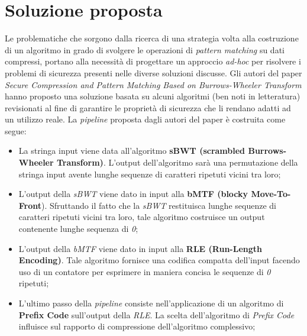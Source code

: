 \section{Soluzione proposta} %
Le problematiche che sorgono dalla ricerca di una strategia volta alla costruzione di un algoritmo in grado di svolgere le operazioni di \emph{pattern matching} su dati compressi, portano alla necessità di progettare un approccio \emph{ad-hoc} per risolvere i problemi di sicurezza presenti nelle diverse soluzioni discusse. Gli autori del paper \emph{Secure Compression and Pattern Matching Based on Burrows-Wheeler Transform} \cite{zeng2018secure} hanno proposto una soluzione basata su alcuni algoritmi (ben noti in letteratura) revisionati al fine di garantire le proprietà di sicurezza che li rendano adatti ad un utilizzo reale. La \emph{pipeline} proposta dagli autori del paper \cite{zeng2018secure} è costruita come segue:
\begin{itemize}
    \item La stringa input viene data all'algoritmo \textbf{sBWT (scrambled Burrows-Wheeler Transform)}. L'output dell'algoritmo sarà una permutazione della stringa input avente lunghe sequenze di caratteri ripetuti vicini tra loro;
    \item L'output della \emph{sBWT} viene dato in input alla \textbf{bMTF (blocky Move-To-Front}). Sfruttando il fatto che la \emph{sBWT} restituisca lunghe sequenze di caratteri ripetuti vicini tra loro, tale algoritmo costruisce un output contenente lunghe sequenza di \emph{0}; 
    \item L'output della \emph{bMTF} viene dato in input alla \textbf{RLE (Run-Length Encoding)}. Tale algoritmo fornisce una codifica compatta dell'input facendo uso di un contatore per esprimere in maniera concisa le sequenze di \emph{0} ripetuti;
    \item L'ultimo passo della \emph{pipeline} consiste nell'applicazione di un algoritmo di \textbf{Prefix Code} sull'output della \emph{RLE}. La scelta dell'algoritmo di \emph{Prefix Code} influisce sul rapporto di compressione dell'algoritmo complessivo;
\end{itemize}
